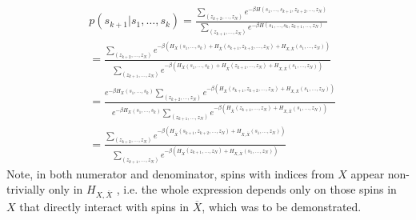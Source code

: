     \begin{align}
      &p(s_{k+1}|s_1, \ldots, s_k) = \frac{\sum\limits_{(z_{k+2}, \ldots, z_N)}e^{-\beta H(s_1, \ldots, s_{k+1}, z_{k+2},\ldots,z_N)}}{\sum\limits_{(z_{k+1}, \ldots, z_N)}e^{-\beta H(s_1, \ldots, s_k, z_{k+1},\ldots,z_N)}}                                                                                                                                                     \\
                                  & = \frac{\sum\limits_{(z_{k+2}, \ldots, z_N)}e^{-\beta (H_X(s_1, \ldots, s_k) + H_{\overline{X}}(s_{k+1}, z_{k+2},\ldots,z_N) + H_{X, \overline{X}}(s_1, \ldots, z_N))}}{\sum\limits_{(z_{k+1}, \ldots, z_N)}e^{-\beta (H_X(s_1, \ldots, s_k) + H_{\overline{X}}(z_{k+1}, \ldots,z_N) + H_{X, \overline{X}}(s_1, \ldots, z_N))}}                 \\
                                  & = \frac{e^{-\beta H_X(s_1, \ldots, s_k)}\sum\limits_{(z_{k+2}, \ldots, z_N)} e^{-\beta(H_{\overline{X}}(s_{k+1}, z_{k+2},\ldots,z_N) + H_{X, \overline{X}}(s_1, \ldots, z_N))}}{e^{-\beta H_X(s_1, \ldots, s_k)}\sum\limits_{(z_{k+1}, \ldots, z_N)}e^{ -\beta(H_{\overline{X}}(z_{k+1}, \ldots,z_N) + H_{X, \overline{X}}(s_1, \ldots, z_N))}} \\
                                  & = \frac{\sum\limits_{(z_{k+2}, \ldots, z_N)} e^{-\beta(H_{\overline{X}}(s_{k+1}, z_{k+2},\ldots,z_N) + H_{X, \overline{X}}(s_1, \ldots, z_N))}}{\sum\limits_{(z_{k+1}, \ldots, z_N)}e^{ -\beta(H_{\overline{X}}(z_{k+1}, \ldots,z_N) + H_{X, \overline{X}}(s_1, \ldots, z_N))}}
      \end{align}
    Note, in both numerator and denominator, spins with indices from $X$ appear
    non-trivially only in $H_{X, \overline{X}}$ , i.e. the whole expression depends
    only on those spins in $X$ that directly interact with spins in $\overline{X}$,
which was to be demonstrated.
